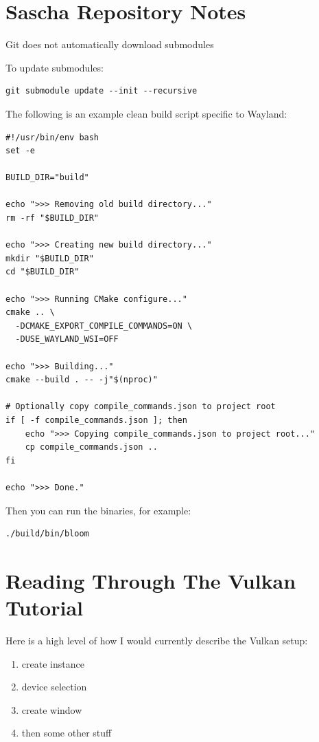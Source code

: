 \documentclass{article}
\begin{document}
\section*{Sascha Repository Notes}
\par Git does not automatically download submodules

\par To update submodules:
\begin{verbatim}
git submodule update --init --recursive
\end{verbatim}

\par The following is an example clean build script specific to Wayland:

\begin{verbatim}
#!/usr/bin/env bash
set -e

BUILD_DIR="build"

echo ">>> Removing old build directory..."
rm -rf "$BUILD_DIR"

echo ">>> Creating new build directory..."
mkdir "$BUILD_DIR"
cd "$BUILD_DIR"

echo ">>> Running CMake configure..."
cmake .. \
  -DCMAKE_EXPORT_COMPILE_COMMANDS=ON \
  -DUSE_WAYLAND_WSI=OFF

echo ">>> Building..."
cmake --build . -- -j"$(nproc)"

# Optionally copy compile_commands.json to project root
if [ -f compile_commands.json ]; then
    echo ">>> Copying compile_commands.json to project root..."
    cp compile_commands.json ..
fi

echo ">>> Done."
\end{verbatim}

Then you can run the binaries, for example:
\begin{verbatim}
./build/bin/bloom
\end{verbatim}

\section*{Reading Through The Vulkan Tutorial}
Here is a high level of how I would currently describe the Vulkan setup:

\begin{enumerate}
  \item create instance
  \item device selection
  \item create window
  \item then some other stuff
\end{enumerate}
\end{document}
